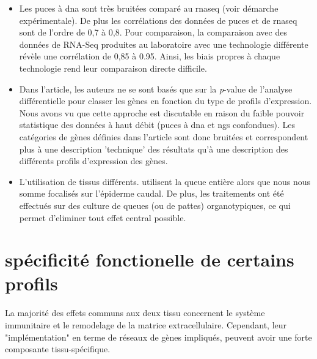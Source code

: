 \documentclass[../main.tex]{subfiles}
\begin{document}
\begin{itemize}
\item Les puces à \gls{dna} sont très bruitées comparé au \gls{rnaseq} (voir démarche expérimentale).
De plus les corrélations des données de puces et de \gls{rnaseq} sont de l'ordre de 0,7 à 0,8.
Pour comparaison, la comparaison avec des données de RNA-Seq produites au laboratoire avec une technologie différente révèle une corrélation de 0,85 à 0.95.
Ainsi, les biais propres à chaque technologie rend leur comparaison directe difficile.
\item Dans l'article, les auteurs ne se sont basés que sur la \textit{p}-value de l'analyse différentielle pour classer les gènes en fonction du type de profils d'expression.
Nous avons vu que cette approche est discutable en raison du faible pouvoir statistique des données à haut débit (puces à \gls{dna} et \gls{ngs} confondues).
Les catégories de gènes définies dans l'article sont donc bruitées et correspondent plus à une description 'technique' des résultats qu'à une description des différents profils d'expression des gènes.
\item L'utilisation de tissus différents.
\citep{Kulkarni2011} utilisent la queue entière alors que nous nous somme focalisés sur l'épiderme caudal.
De plus, les traitements ont été effectués sur des culture de queues (ou de pattes) organotypiques, ce qui permet d'eliminer tout effet central possible.
\end{itemize}




\section{spécificité fonctionelle de certains profils}

La majorité des effets communs aux deux tissu concernent le système immunitaire et le remodelage de la matrice extracellulaire.
Cependant, leur "implémentation" en terme de réseaux de gènes impliqués, peuvent avoir une forte composante tissu-spécifique.
\end{document}
